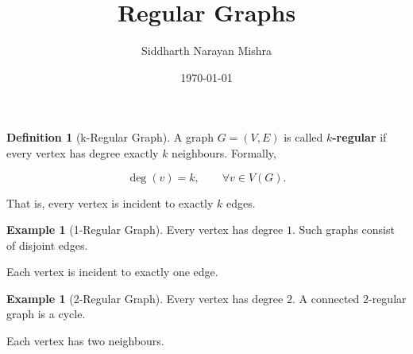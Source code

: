 \documentclass[11pt]{article}
\title{Regular Graphs}
\author{Siddharth Narayan Mishra}
\date{\today}
\theoremstyle{plain}
\theoremstyle{definition}
\newtheorem{definition}[theorem]{Definition}
\newtheorem{example}[theorem]{Example}
\theoremstyle{remark}
\begin{document}
\maketitle

\begin{definition}[k-Regular Graph]
  A graph $G=(V,E)$ is called \textbf{$k$-regular} if every vertex has degree exactly $k$ neighbours. Formally,

  \[
    \deg(v)=k,\qquad \forall v\in V(G).
  \]

  That is, every vertex is incident to exactly $k$ edges.
\end{definition}

\bigskip

\begin{example}[1-Regular Graph]
  Every vertex has degree $1$. Such graphs consist of disjoint edges.

  \begin{center}
  \end{center}

  Each vertex is incident to exactly one edge.
\end{example}

\bigskip

\begin{example}[2-Regular Graph]
  Every vertex has degree $2$. A connected $2$-regular graph is a cycle.

  \begin{center}
  \end{center}

  Each vertex has two neighbours.
\end{example}
\end{document}
